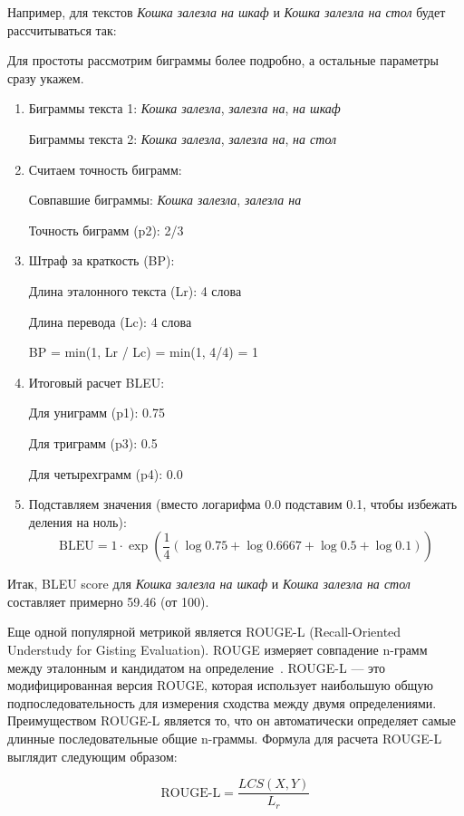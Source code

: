 \documentclass[LI,VKR]{HSEUniversity}
\begin{document}
Например, для текстов \textit{Кошка залезла на шкаф} и \textit{Кошка залезла на стол} будет рассчитываться так:

Для простоты рассмотрим биграммы более подробно, а остальные параметры сразу укажем.

\begin{enumerate}
    \item Биграммы текста 1: \textit{Кошка залезла}, \textit{залезла на}, \textit{на шкаф}

Биграммы текста 2: \textit{Кошка залезла}, \textit{залезла на}, \textit{на стол}
    \item Считаем точность биграмм:

Совпавшие биграммы: \textit{Кошка залезла}, \textit{залезла на}

Точность биграмм (p2): 2/3
    \item Штраф за краткость (BP):

Длина эталонного текста (Lr): 4 слова

Длина перевода (Lc): 4 слова

BP = min(1, Lr / Lc) = min(1, 4/4) = 1
    \item Итоговый расчет BLEU:

Для униграмм (p1): 0.75

Для триграмм (p3): 0.5

Для четырехграмм (p4): 0.0
    \item Подставляем значения (вместо логарифма 0.0 подставим 0.1, чтобы избежать деления на ноль):
\[
\text{BLEU} = 1 \cdot \exp \left( \frac{1}{4} (\log 0.75 + \log 0.6667 + \log 0.5 + \log 0.1) \right)
\]
\end{enumerate}

Итак, BLEU score для \textit{Кошка залезла на шкаф} и \textit{Кошка залезла на стол} составляет примерно 59.46 (от 100).

Еще одной популярной метрикой является ROUGE-L (Recall-Oriented Understudy for Gisting Evaluation).
ROUGE измеряет совпадение n-грамм между эталонным и кандидатом на определение~\cite{ROUGE}.
ROUGE-L — это модифицированная версия ROUGE, которая использует наибольшую общую подпоследовательность
для измерения сходства между двумя определениями.
Преимуществом ROUGE-L является то, что он автоматически определяет самые длинные последовательные общие n-граммы.
Формула для расчета ROUGE-L выглядит следующим образом:

\begin{equation}
\text{ROUGE-L} = \frac{LCS(X, Y)}{L_r}
\end{equation}
\end{document}
